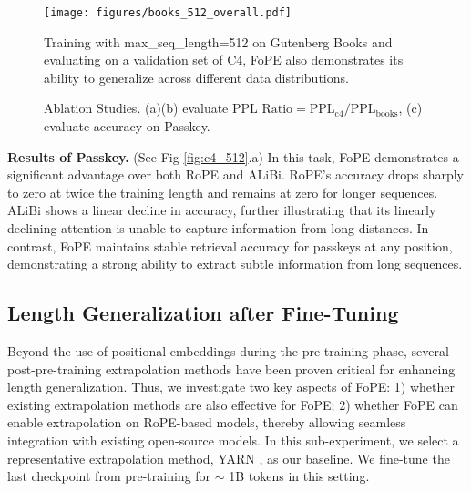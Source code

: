 \begin{figure}
    \centering
    \texttt{[image: figures/books\_512\_overall.pdf]}
    \caption{Training with max\_seq\_length=512 on Gutenberg Books and evaluating on a validation set of C4, FoPE also demonstrates its ability to generalize across different data distributions.}
    \label{fig:books_512}
\end{figure}

\begin{figure*}[t]
    \hfill
    \hfill
    \caption{Ablation Studies. (a)(b) evaluate $\text{PPL Ratio}=\text{PPL}_{\text{c4}}/\text{PPL}_{\text{books}}$, (c) evaluate accuracy on Passkey.}
\end{figure*}

\textbf{Results of Passkey.} (See Fig \ref{fig:c4_512}.a) In this task, FoPE demonstrates a significant advantage over both RoPE and ALiBi. RoPE’s accuracy drops sharply to zero at twice the training length and remains at zero for longer sequences. ALiBi shows a linear decline in accuracy, further illustrating that its linearly declining attention is unable to capture information from long distances. In contrast, FoPE maintains stable retrieval accuracy for passkeys at any position, demonstrating a strong ability to extract subtle information from long sequences.

\subsection{Length Generalization after Fine-Tuning}
\label{subsec:fine-tuning}
Beyond the use of positional embeddings during the pre-training phase, several post-pre-training extrapolation methods \citep{peng2023yarn, chen2024clex} have been proven critical for enhancing length generalization. Thus, we investigate two key aspects of FoPE: 1) whether existing extrapolation methods are also effective for FoPE; 2) whether FoPE can enable extrapolation on RoPE-based models, thereby allowing seamless integration with existing open-source models. In this sub-experiment, we select a representative extrapolation method, YARN \citep{peng2023yarn}, as our baseline. We fine-tune the last checkpoint from pre-training for $\sim$ 1B tokens in this setting.

